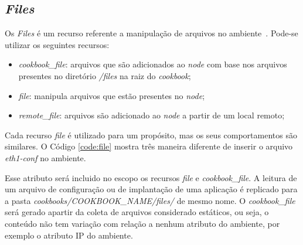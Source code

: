 \subsection{\textit{Files}}
\label{sec:cbfiles}

Os \textit{Files} é um recurso referente a manipulação de arquivos no ambiente~\cite{chefdoc:2016}.
Pode-se utilizar os seguintes recursos:

\begin{itemize}
  \item \textit{cookbook\_file}: arquivos que são adicionados ao \textit{node} com base
    nos arquivos presentes no diretório \textit{/files} na raiz do \textit{cookbook};
  \item \textit{file}: manipula arquivos que estão presentes no \textit{node};
  \item \textit{remote\_file}: arquivos são adicionado ao \textit{node} a partir de um
    local remoto;
\end{itemize}

Cada recurso \textit{file} é utilizado para um propósito, mas os seus comportamentos
são similares. O Código \ref{code:file} mostra três maneira diferente de
inserir o arquivo \textit{eth1-conf} no ambiente.

\begin{minipage}{.90\textwidth}
  \lstset{style=shell}
  
\end{minipage}

Esse atributo será incluido no escopo os recursos \textit{file} e \textit{cookbook\_file}.
A leitura de um arquivo de configuração ou de implantação de uma aplicação 
é replicado para a pasta \textit{cookbooks/COOKBOOK\_NAME/files/} de mesmo nome.
O \textit{cookbook\_file} será gerado apartir da coleta de arquivos considerado estáticos,
ou seja, o conteúdo não tem variação com relação a nenhum atributo do ambiente,
por exemplo o atributo IP do ambiente.

